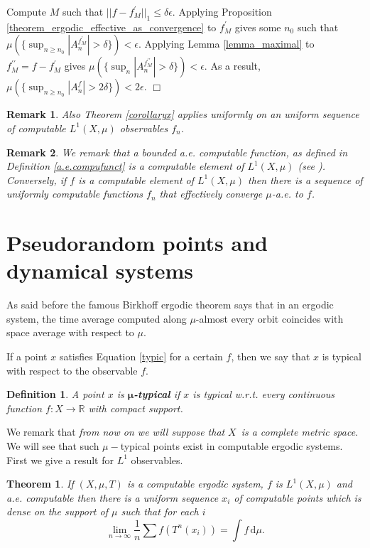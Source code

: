 \documentclass[copyright,creativecommons]{eptcs}
\newtheorem{theorem}{Theorem}
\newtheorem{definition}{Definition}
\newtheorem{remark}{Remark}
\numberwithin{equation}{section}
\begin{document}
Compute $M$ such that $||{f-f_{M}^{\prime }}||_{1}\leq \delta \epsilon $.
Applying Proposition \ref{theorem_ergodic_effective_as_convergence} to $f_{M}^{\prime }$ gives some $n_{0}$ such that $\mu (\{\sup_{n\geq
n_{0}}|A_{n}^{f_{M}^{\prime }}|>\delta \})<\epsilon $. Applying Lemma \ref {lemma_maximal} to $f_{M}^{\prime \prime }=f-f_{M}^{\prime }$ gives $\mu
(\{\sup_{n}|A_{n}^{f_{M}^{\prime \prime }}|>\delta \})<\epsilon $. As a
result, $\mu (\{\sup_{n\geq n_{0}}|A_{n}^{f}|>2\delta \})<2\epsilon $.
$\Box $
\begin{remark}
\label{remarkboundunif2} Also Theorem \ref{corollaryx} applies uniformly on
an uniform sequence of computable $L^{1}(X,\mu )$ observables $f_{n}$.
\end{remark}

\begin{remark}
\label{remarkcompuL1} We remark that a bounded a.e. computable function, as
defined in Definition \ref{a.e.compufunct} is a computable element of $L^{1}(X,\mu )$ (see \cite{HoyRojCiE09}). Conversely, if $f$ is a computable
element of $L^{1}(X,\mu )$ then there is a sequence of uniformly computable
functions $f_{n}$ that effectively converge $\mu $-a.e. to $f$.
\end{remark}

\section{Pseudorandom points and dynamical systems}

As said before the famous Birkhoff ergodic theorem says that in an ergodic
system, the time average computed along $\mu $-almost every orbit coincides
with space average with respect to $\mu $.

If a point $x$ satisfies Equation \ref{typic} for a certain $f$, then we say
that $x$ is typical with respect to the observable $f$.

\begin{definition}
\label{mutyp}A point $x$ is $\boldsymbol{\mu}$\textbf{\emph{-typical}} if $x$
is typical w.r.t. every continuous function $f:X\to \mathbb{R}$ with compact
support.
\end{definition}

We remark that \emph{from now on we will suppose that }$X$\emph{\ is a
complete metric space}. We will see that such $\mu -$typical points exist in
computable ergodic systems. First we give a result for $L^{1}$ observables.

\begin{theorem}
\label{thm1}If $(X,\mu ,T)$ is a computable ergodic system, $f$ is $L^{1}(X,\mu )$ and a.e. computable then there is a uniform sequence $x_{i}$
of computable points which is dense on the support of $\mu $ such that for
each $i$
\begin{equation*}
\underset{n\rightarrow \infty }{\lim }\frac{1}{n}\sum f(T^{n}(x_{i}))=\int \!{f}\,\mathrm{d}{\mu .}
\end{equation*}
\end{theorem}
\end{document}

